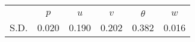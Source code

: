 \begin{tabular}{l*{1}{ccccc}}
\toprule
                &\multicolumn{5}{c}{}                             \\
                &$  p$&$ u $&$ v $&$ \theta $&$ w $\\
\midrule
S.D.              &    0.020&    0.190&    0.202&    0.382&    0.016\\
\bottomrule
\end{tabular}
